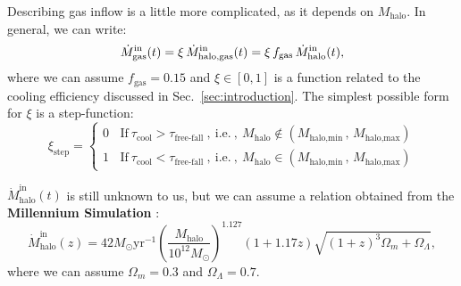 \documentclass[fleqn,usenatbib]{mnras}
\begin{document}
Describing gas inflow is a little more complicated, as it depends on $M_\text{halo}$. In general, we can write:
\begin{equation}
    \dot{M}_\text{gas}^\text{in}(t) = \xi \, \dot{M}_\text{halo,\rm gas}^\text{in}(t) = \xi \, f_\text{gas} \, \dot{M}_\text{halo}^\text{in}(t),
	\label{eq:mgas_inflow}
\end{equation}
where we can assume $f_\text{gas}=0.15$ and $\xi \in [0,1]$ is a function related to the cooling efficiency discussed in Sec.~\ref{sec:introduction}. The simplest possible form for $\xi$ is a step-function:
{\fontsize{7.9pt}{7.9pt}\begin{equation}
    \xi_\text{step} =
    \begin{cases}
        0 \:\:\:\: \text{If} \: \tau_\text{cool} > \tau_\text{free-fall} \: , \: \text{i.e.} \: , \: M_{\text{halo}} \notin \left( M_{\text{halo,min}} \, , \, M_{\text{halo,max}} \right)\\
        1 \:\:\:\: \text{If} \: \tau_\text{cool} < \tau_\text{free-fall} \: , \: \text{i.e.} \: , \: M_{\text{halo}} \in \left( M_{\text{halo,min}} \, , \, M_{\text{halo,max}} \right)
    \end{cases}
	\label{eq:xi_step}
\end{equation}}

$\dot{M}_\text{halo}^\text{in}(t)$ is still unknown to us, but we can assume a relation obtained from the \textbf{Millennium Simulation} \citep{McBride_2009}:
{\fontsize{7.9pt}{7.9pt}\begin{equation}
    \dot{M}_\text{halo}^\text{in}(z) = 42 M_{\odot} \text{yr}^{-1} \left(\dfrac{M_\text{halo}}{10^{12}M_{\odot}}\right)^{1.127} (1+1.17z) \sqrt{(1+z)^3 \Omega_m + \Omega_\Lambda},
	\label{eq:mcbride}
\end{equation}}
where we can assume $\Omega_m=0.3$ and $\Omega_\Lambda=0.7$.
\end{document}
